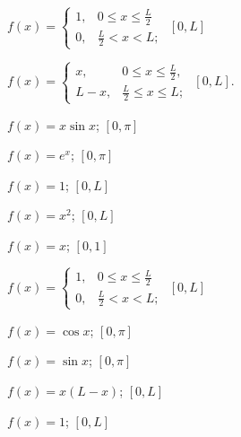 \begin{exerciselist}
  \item\label{exer:11.3.14} \Cex $f(x)= \left\{
  \begin{array}{cl}
    1, & 0\le x\le\frac{L}{2} \\
    0, & \frac{L}{2}<x<L;
  \end{array}\right.$ \quad $[0,L]$

  \item\label{exer:11.3.15} \Cex $f(x)= \left\{
  \begin{array}{cl}
    x,   & 0\le x\le\frac{L}{2},  \\
    L-x, & \frac{L}{2}\le x\le L;
  \end{array}\right.$ \quad $[0,L]$.

  \item\label{exer:11.3.16} \Cex $f(x)=x\sin x$; \quad $[0,\pi]$

  \item\label{exer:11.3.17} $f(x)=e^{x}$; \quad $[0,\pi]$


  \item\label{exer:11.3.18} \Cex $f(x)=1$; \quad$[0,L]$

  \item\label{exer:11.3.19} $f(x)=x^{2}$; \quad $[0,L]$

  \item\label{exer:11.3.20} \Cex $f(x)=x$; \quad $[0,1]$

  \item\label{exer:11.3.21} \Cex $f(x)= \left\{
  \begin{array}{cl}
    1, & 0\le x\le\frac{L}{2} \\
    0, & \frac{L}{2}<x<L;
  \end{array}\right.$ \quad $[0,L]$

  \item\label{exer:11.3.22} $f(x)=\cos x$; \quad $[0,\pi]$

  \item\label{exer:11.3.23} $f(x)=\sin x$; \quad $[0,\pi]$

  \item\label{exer:11.3.24} \Cex $f(x)=x(L-x)$; \quad $[0,L]$


  \item\label{exer:11.3.25} \Cex $f(x)=1$; \quad$[0,L]$


\end{exerciselist}
